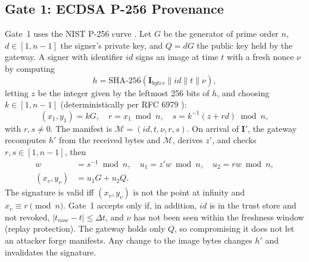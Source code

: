 \documentclass[conference]{IEEEtran}
\begin{document}
\subsection{Gate 1: ECDSA P-256 Provenance}
Gate~1 uses the NIST P-256 curve \cite{fips1865, sec2_2010}. Let $G$ be the generator of prime order $n$, $d \in [1, n-1]$ the signer's private key, and $Q = dG$ the public key held by the gateway. A signer with identifier $id$ signs an image at time $t$ with a fresh nonce $\nu$ by computing
\begin{equation}
    h = \text{SHA-256}(\mathbf{I}_{bytes} \parallel id \parallel t \parallel \nu),
\end{equation}
letting $z$ be the integer given by the leftmost 256 bits of $h$, and choosing $k \in [1, n-1]$ (deterministically per RFC 6979 \cite{rfc6979}):
\begin{equation}
    (x_1, y_1) = kG, \quad r = x_1 \bmod n, \quad s = k^{-1}(z + rd) \bmod n,
\end{equation}
with $r, s \ne 0$. The manifest is $\mathcal{M} = (id, t, \nu, r, s)$. On arrival of $\mathbf{I}'$, the gateway recomputes $h'$ from the received bytes and $\mathcal{M}$, derives $z'$, and checks $r, s \in [1, n-1]$, then
\begin{equation}
\begin{aligned}
    w &= s^{-1} \bmod n, \quad u_1 = z'w \bmod n, \quad u_2 = rw \bmod n, \\
    (x_v, y_v) &= u_1G + u_2Q.
\end{aligned}
\end{equation}
The signature is valid iff $(x_v, y_v)$ is not the point at infinity and $x_v \equiv r \pmod n$. Gate~1 accepts only if, in addition, $id$ is in the trust store and not revoked, $|t_{now} - t| \le \Delta t$, and $\nu$ has not been seen within the freshness window (replay protection). The gateway holds only $Q$, so compromising it does not let an attacker forge manifests. Any change to the image bytes changes $h'$ and invalidates the signature.
\end{document}
